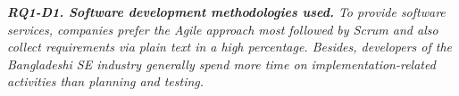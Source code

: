 

\begin{tcolorbox}[flushleft upper,boxrule=1pt,arc=0pt,left=0pt,right=0pt,top=0pt,bottom=0pt,colback=white,after=\ignorespacesafterend\par\noindent]
\nd\it{\bf{RQ1-D1. Software development methodologies used.}} To provide
software services, companies prefer the Agile approach most followed by Scrum
and also collect requirements via plain text in a high percentage. Besides,
developers of the Bangladeshi SE industry generally spend more time on
implementation-related activities than planning and testing. 
\end{tcolorbox}

